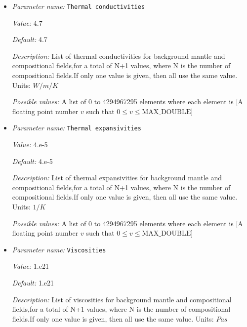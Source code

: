 \begin{itemize}
{\it Possible values:} A list of 0 to 4294967295 elements where each element is [A floating point number $v$ such that $0 \leq v \leq \text{MAX\_DOUBLE}$]
\item {\it Parameter name:} {\tt Thermal conductivities}
\label{parameters:Material model/Multicomponent/Thermal conductivities}


{\it Value:} 4.7


{\it Default:} 4.7


{\it Description:} List of thermal conductivities for background mantle and compositional fields,for a total of N+1 values, where N is the number of compositional fields.If only one value is given, then all use the same value. Units: $W/m/K$ 


{\it Possible values:} A list of 0 to 4294967295 elements where each element is [A floating point number $v$ such that $0 \leq v \leq \text{MAX\_DOUBLE}$]
\item {\it Parameter name:} {\tt Thermal expansivities}
\label{parameters:Material model/Multicomponent/Thermal expansivities}


{\it Value:} 4.e-5


{\it Default:} 4.e-5


{\it Description:} List of thermal expansivities for background mantle and compositional fields,for a total of N+1 values, where N is the number of compositional fields.If only one value is given, then all use the same value. Units: $1/K$


{\it Possible values:} A list of 0 to 4294967295 elements where each element is [A floating point number $v$ such that $0 \leq v \leq \text{MAX\_DOUBLE}$]
\item {\it Parameter name:} {\tt Viscosities}
\label{parameters:Material model/Multicomponent/Viscosities}


{\it Value:} 1.e21


{\it Default:} 1.e21


{\it Description:} List of viscosities for background mantle and compositional fields,for a total of N+1 values, where N is the number of compositional fields.If only one value is given, then all use the same value. Units: $Pa s$



\end{itemize}
